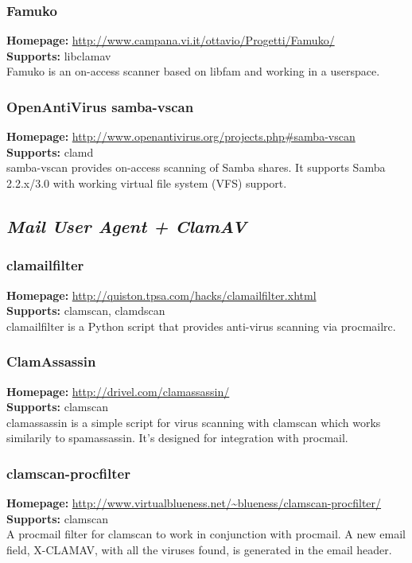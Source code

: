 \documentclass[a4paper,titlepage,12pt]{article}
\begin{document}
    \subsubsection{Famuko}
    \textbf{Homepage:} \url{http://www.campana.vi.it/ottavio/Progetti/Famuko/}\\
    \textbf{Supports:} libclamav\\[4pt]
    Famuko is an on-access scanner based on libfam and working in a userspace.

    \subsubsection{OpenAntiVirus samba-vscan}\label{samba-vscan}
    \textbf{Homepage:} \url{http://www.openantivirus.org/projects.php#samba-vscan}\\
    \textbf{Supports:} clamd\\[4pt]
    samba-vscan provides on-access scanning of Samba shares. It supports
    Samba 2.2.x/3.0 with working virtual file system (VFS) support. 

    \subsection{\emph{Mail User Agent + ClamAV}}

    \subsubsection{clamailfilter}
    \textbf{Homepage:} \url{http://quiston.tpsa.com/hacks/clamailfilter.xhtml}\\
    \textbf{Supports:} clamscan, clamdscan\\[4pt]
    clamailfilter is a Python script that provides anti-virus scanning via
    procmailrc.

    \subsubsection{ClamAssassin}
    \textbf{Homepage:} \url{http://drivel.com/clamassassin/}\\
    \textbf{Supports:} clamscan\\[4pt]
     clamassassin is a simple script for virus scanning with clamscan which
     works similarily to spamassassin. It's designed for integration with
     procmail.

    \subsubsection{clamscan-procfilter}
    \textbf{Homepage:} \url{http://www.virtualblueness.net/~blueness/clamscan-procfilter/}\\
    \textbf{Supports:} clamscan\\[4pt]
    A procmail filter for clamscan to work in conjunction with procmail.
    A new email field, X-CLAMAV, with all the viruses found, is generated in
    the email header.                       
\end{document}
